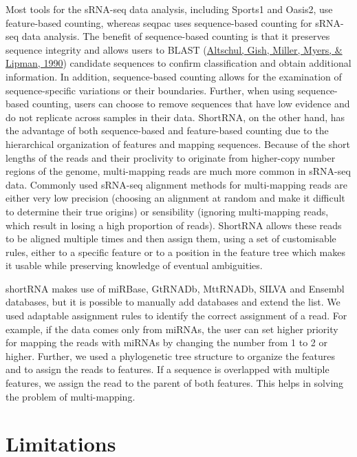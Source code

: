 \documentclass[12pt,twoside]{reedthesis}
\begin{document}
Most tools for the sRNA-seq data analysis, including Sports1 and Oasis2,
use feature-based counting, whereas seqpac uses sequence-based counting
for sRNA-seq data analysis. The benefit of sequence-based counting is
that it preserves sequence integrity and allows users to BLAST
(\protect\hyperlink{ref-altschul1990}{Altschul, Gish, Miller, Myers, \& Lipman, 1990}) candidate sequences to confirm classification and obtain
additional information. In addition, sequence-based counting allows for
the examination of sequence-specific variations or their boundaries.
Further, when using sequence-based counting, users can choose to remove
sequences that have low evidence and do not replicate across samples in
their data. ShortRNA, on the other hand, has the advantage of both
sequence-based and feature-based counting due to the hierarchical
organization of features and mapping sequences. Because of the short
lengths of the reads and their proclivity to originate from higher-copy
number regions of the genome, multi-mapping reads are much more common
in sRNA-seq data. Commonly used sRNA-seq alignment methods for
multi-mapping reads are either very low precision (choosing an alignment
at random and make it difficult to determine their true origins) or
sensibility (ignoring multi-mapping reads, which result in losing a high
proportion of reads). ShortRNA allows these reads to be aligned multiple
times and then assign them, using a set of customisable rules, either to
a specific feature or to a position in the feature tree which makes it
usable while preserving knowledge of eventual ambiguities.

shortRNA makes use of miRBase, GtRNADb, MttRNADb, SILVA and Ensembl
databases, but it is possible to manually add databases and extend the
list. We used adaptable assignment rules to identify the correct
assignment of a read. For example, if the data comes only from miRNAs,
the user can set higher priority for mapping the reads with miRNAs by
changing the number from 1 to 2 or higher. Further, we used a
phylogenetic tree structure to organize the features and to assign the
reads to features. If a sequence is overlapped with multiple features,
we assign the read to the parent of both features. This helps in solving
the problem of multi-mapping.

\hypertarget{limitations}{%
\section{Limitations}\label{limitations}}
\end{document}
